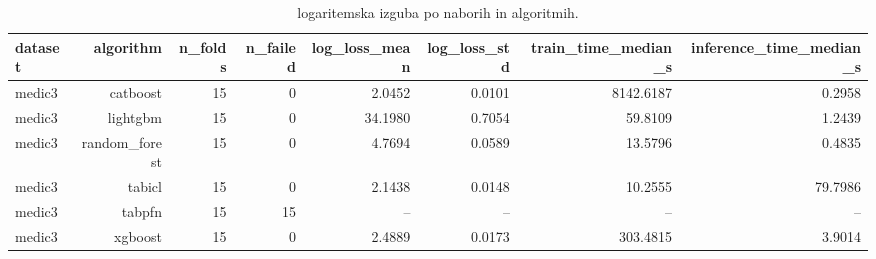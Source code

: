 \begin{table}[htbp]
\centering
\caption{logaritemska izguba po naborih in algoritmih.}
\label{tab:per-dataset}
\begin{tabular}{lrrrrrrr}
\hline
dataset & algorithm & n\_folds & n\_failed & log\_loss\_mean & log\_loss\_std & train\_time\_median\_s & inference\_time\_median\_s \\
\hline
medic3 & catboost & 15 & 0 & 2.0452 & 0.0101 & 8142.6187 & 0.2958 \\
medic3 & lightgbm & 15 & 0 & 34.1980 & 0.7054 & 59.8109 & 1.2439 \\
medic3 & random\_forest & 15 & 0 & 4.7694 & 0.0589 & 13.5796 & 0.4835 \\
medic3 & tabicl & 15 & 0 & 2.1438 & 0.0148 & 10.2555 & 79.7986 \\
medic3 & tabpfn & 15 & 15 & -- & -- & -- & -- \\
medic3 & xgboost & 15 & 0 & 2.4889 & 0.0173 & 303.4815 & 3.9014 \\
\hline
\end{tabular}
\end{table}
